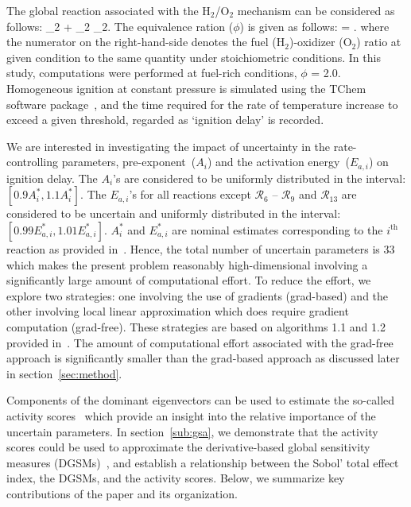 The global reaction associated with the H$_2$/O$_2$ mechanism can
be considered as follows:
%
_2 + _2 _2.
\label{eq:global}
\ee 
%
The equivalence ration ($\phi$) is given as follows:
%
\be
\phi = .
\label{eq:phi}
\ee
%
where the numerator on the right-hand-side denotes the fuel (H$_2$)-oxidizer (O$_2$) ratio at given
condition to the same quantity under stoichiometric conditions. In this study, computations were performed
at fuel-rich conditions, $\phi$ = 2.0. Homogeneous ignition at constant pressure is simulated using the
TChem software package~\cite{Safta:2011}, and the time required for the rate of temperature increase
to exceed a given threshold, regarded as `ignition delay' is recorded. 

We are interested in investigating the impact of uncertainty in the rate-controlling parameters, 
pre-exponent~($A_i$) and the activation energy~($E_{a,i}$) on ignition delay. The $A_i$'s are
considered to be uniformly distributed in the interval: $[0.9A_i^\ast, 1.1A_i^\ast]$.
The $E_{a,i}$'s for all reactions except $\mathcal{R}_6$ -- $\mathcal{R}_9$ and $\mathcal{R}_{13}$
are considered to be uncertain and uniformly distributed in the interval: $[0.99E_{a,i}^\ast, 1.01E_{a,i}^\ast]$.
$A_i^\ast$ and $E_{a,i}^\ast$ are nominal estimates corresponding to the $i^\text{th}$ reaction
as provided in~\cite{Yetter:1991}. Hence, the total number of uncertain parameters is 33 which makes the
present problem reasonably high-dimensional involving a significantly large amount of computational
effort. To reduce the effort, we explore two strategies: one involving the use of gradients (grad-based)
and the other involving local linear approximation which does require gradient computation (grad-free).
These strategies are based on algorithms 1.1 and 1.2 provided  in~\cite{Constantine:2015}. The amount of 
computational effort associated with the grad-free approach is significantly smaller than the grad-based
approach as discussed later in section~\ref{sec:method}.

Components of the dominant eigenvectors can be used to estimate the so-called 
activity scores~\cite{Diaz:2016,Constantine:2017} which provide an insight into the relative importance
of the uncertain parameters. In 
section~\ref{sub:gsa}, we demonstrate that the activity scores could be used to approximate the 
derivative-based global sensitivity measures (DGSMs)~\cite{Sobol:2009}, and establish a relationship between
the Sobol' total effect index, the DGSMs, and the activity scores. Below, we summarize key contributions of
the paper and its organization. 

